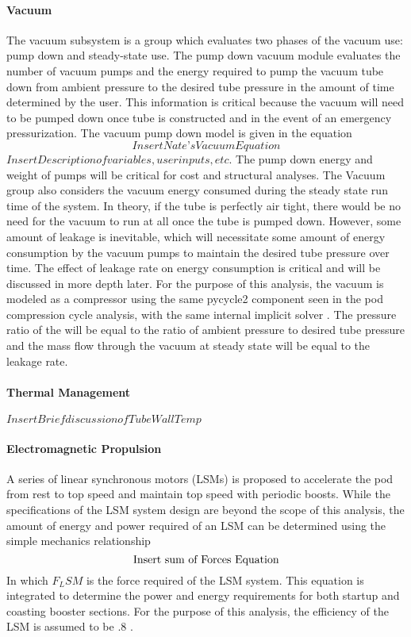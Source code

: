\paragraph{Vacuum}
The vacuum subsystem is a group which evaluates two phases of the vacuum use: pump down and steady-state use. The pump down vacuum module evaluates the number of vacuum pumps and the energy required to pump the vacuum tube down from ambient pressure to the desired tube pressure in the amount of time determined by the user. This information is critical because the vacuum will need to be pumped down once tube is constructed and in the event of an emergency pressurization. The vacuum pump down model is given in the equation
\begin{equation}
	\label{eq:vacuum}
	Insert Nate’s Vacuum Equation
\end{equation}
$Insert Description of variables, user inputs, etc.$
The pump down energy and weight of pumps will be critical for cost and structural analyses.
The Vacuum group also considers the vacuum energy consumed during the steady state run time of the system. In theory, if the tube is perfectly air tight, there would be no need for the vacuum to run at all once the tube is pumped down. However, some amount of leakage is inevitable, which will necessitate some amount of energy consumption by the vacuum pumps to maintain the desired tube pressure over time. The effect of leakage rate on energy consumption is critical and will be discussed in more depth later. For the purpose of this analysis, the vacuum is modeled as a compressor using the same pycycle2 component seen in the pod compression cycle analysis, with the same internal implicit solver \cite{pycycle2}. The pressure ratio of the will be equal to the ratio of ambient pressure to desired tube pressure and the mass flow through the vacuum at steady state will be equal to the leakage rate.
\paragraph{Thermal Management}
$Insert Brief discussion of Tube Wall Temp$  \cite{Chin}
\paragraph{Electromagnetic Propulsion}
A series of linear synchronous motors (LSMs) is proposed to accelerate the pod from rest to top speed and maintain top speed with periodic boosts. While the specifications of the LSM system design are beyond the scope of this analysis, the amount of energy and power required of an LSM can be determined using the simple mechanics relationship
\begin{equation}
	\label{eq:sum_of_forces}
	$Insert sum of Forces Equation$
\end{equation}
In which $F_LSM$ is the force required of the LSM system. This equation is integrated to determine the power and energy requirements for both startup and coasting booster sections. For the purpose of this analysis, the efficiency of the LSM is assumed to be .8 \cite{LSM}.
